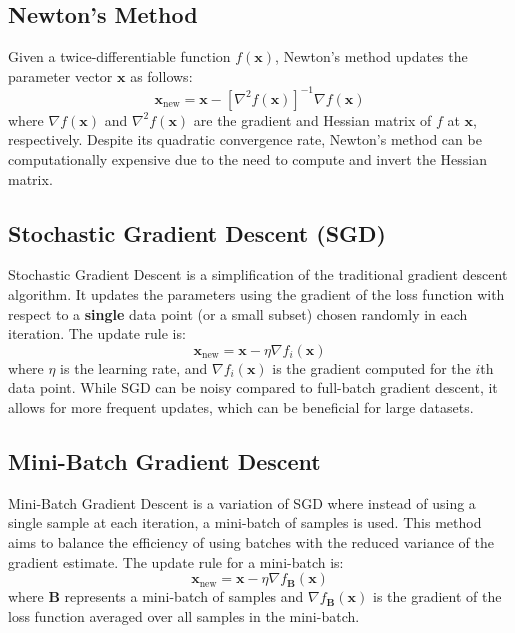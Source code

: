 \documentclass[8pt, a4paper, landscape, includeheadfoot]{extarticle}
\begin{document}
\begin{multicols*}{4}
	\subsection{Newton's Method}
	Given a twice-differentiable function \(f(\mathbf{x})\), Newton's method updates the parameter vector \(\mathbf{x}\) as follows:
	\[
		\mathbf{x}_{\text{new}} = \mathbf{x} - \left[\nabla^2 f(\mathbf{x})\right]^{-1} \nabla f(\mathbf{x})
	\]
	where \(\nabla f(\mathbf{x})\) and \(\nabla^2 f(\mathbf{x})\) are the gradient and Hessian matrix of \(f\) at \(\mathbf{x}\), respectively. Despite its quadratic convergence rate, Newton's method can be computationally expensive due to the need to compute and invert the Hessian matrix.

	\subsection{Stochastic Gradient Descent (SGD)}
	Stochastic Gradient Descent is a simplification of the traditional gradient descent algorithm. It updates the parameters using the gradient of the loss function with respect to a \textbf{single} data point (or a small subset) chosen randomly in each iteration. The update rule is:
	\[
		\mathbf{x}_{\text{new}} = \mathbf{x} - \eta \nabla f_i(\mathbf{x})
	\]
	where \(\eta\) is the learning rate, and \(\nabla f_i(\mathbf{x})\) is the gradient computed for the \(i\)th data point. While SGD can be noisy compared to full-batch gradient descent, it allows for more frequent updates, which can be beneficial for large datasets.

	\subsection{Mini-Batch Gradient Descent}
	Mini-Batch Gradient Descent is a variation of SGD where instead of using a single sample at each iteration, a mini-batch of samples is used. This method aims to balance the efficiency of using batches with the reduced variance of the gradient estimate. The update rule for a mini-batch is:
	\[
		\mathbf{x}_{\text{new}} = \mathbf{x} - \eta \nabla f_{\mathbf{B}}(\mathbf{x})
	\]
	where \(\mathbf{B}\) represents a mini-batch of samples and \(\nabla f_{\mathbf{B}}(\mathbf{x})\) is the gradient of the loss function averaged over all samples in the mini-batch.


\end{multicols*}
\end{document}
